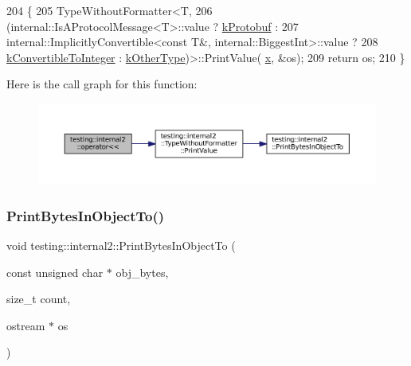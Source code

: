 \begin{DoxyCode}
204                                                         \{
205   TypeWithoutFormatter<T,
206       (internal::IsAProtocolMessage<T>::value ? \hyperlink{namespacetesting_1_1internal2_aeb8161b0b3ee503347b0662d7028fd57a14aaf98a2547ecf43eef0868d54b1383}{kProtobuf} :
207        internal::ImplicitlyConvertible<const T&, internal::BiggestInt>::value ?
208        \hyperlink{namespacetesting_1_1internal2_aeb8161b0b3ee503347b0662d7028fd57a9bdcf3f1548f498b2b7f097306ea0224}{kConvertibleToInteger} : \hyperlink{namespacetesting_1_1internal2_aeb8161b0b3ee503347b0662d7028fd57abe8aaea44751d6ebd0cdf5bd94451db1}{kOtherType})>::PrintValue(
      \hyperlink{namespaceinteractive__marker_acda52804aef30b460a72fb21ee01d69d}{x}, &os);
209   \textcolor{keywordflow}{return} os;
210 \}
\end{DoxyCode}
Here is the call graph for this function\+:
\nopagebreak
\begin{figure}[H]
\begin{center}
\leavevmode
\includegraphics[width=350pt]{namespacetesting_1_1internal2_a07dbe129beb8952074f04b599dfce39b_cgraph}
\end{center}
\end{figure}
\mbox{\label{namespacetesting_1_1internal2_abfb9aa80365f93b952e9a4bea09947a8}} 
\subsubsection{\texorpdfstring{Print\+Bytes\+In\+Object\+To()}{PrintBytesInObjectTo()}\hspace{0.1cm}{\footnotesize\ttfamily [1/2]}}
{\footnotesize\ttfamily void testing\+::internal2\+::\+Print\+Bytes\+In\+Object\+To (\begin{DoxyParamCaption}\item[{const unsigned char $\ast$}]{obj\+\_\+bytes,  }\item[{size\+\_\+t}]{count,  }\item[{ostream $\ast$}]{os }\end{DoxyParamCaption})}



